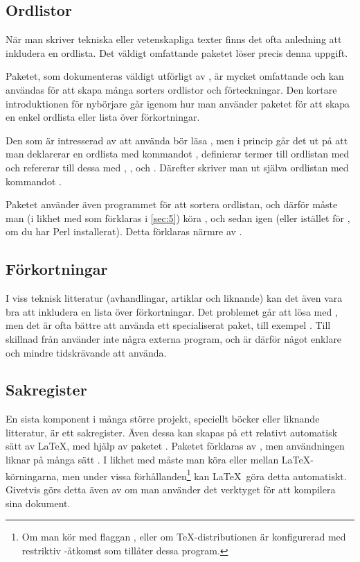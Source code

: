 \documentclass[10pt,../../a4.tex]{subfiles}
\begin{document}
\subsection{Ordlistor}\label{sec:2:glossaries}
När man skriver tekniska eller vetenskapliga texter finns det ofta
anledning att inkludera en ordlista. Det väldigt omfattande paketet
 löser precis denna uppgift.

Paketet, som dokumenteras väldigt utförligt av \textcite{Talbot13a},
är mycket omfattande och kan användas för att skapa många sorters
ordlistor och förteckningar. Den kortare introduktionen för nybörjare
\parencite{Talbot13b} går igenom hur man använder paketet för att skapa
en enkel ordlista eller lista över förkortningar.

Den som är intresserad av att använda  bör läsa 
\textcite{Talbot13b}, men i princip går det ut på att man deklarerar en
ordlista med kommandot , definierar termer till
ordlistan med  och refererar till dessa med
, ,  och . Därefter skriver man
ut själva ordlistan med kommandot .

Paketet använder även programmet  för att sortera ordlistan,
och därför måste man (i likhet med  som förklaras i
\cref{sec:5}) köra ,  och sedan 
igen (eller  istället för , om du har
Perl installerat). Detta förklaras närmre av
\textcite{Talbot13a,Talbot13b}.

\subsection{Förkortningar}\label{sec:2:acro}
I viss teknisk litteratur (avhandlingar, artiklar och liknande) kan det 
även vara bra att inkludera en lista över förkortningar. Det problemet
går att lösa med , men det är ofta bättre att använda
ett specialiserat paket, till exempel 
\parencite{Niederberger13}. Till skillnad
från  använder  inte några externa program,
och är därför något enklare och mindre tidskrävande att använda.

\subsection{Sakregister}\label{sec:2:imakeidx}
En sista komponent i många större projekt, speciellt böcker eller
liknande litteratur, är ett sakregister. Även dessa kan skapas på ett
relativt automatisk sätt av \LaTeX, med hjälp av paketet .
Paketet förklaras av \textcite{Beccari12}, men användningen liknar
på många sätt . I likhet med  måste man
köra  eller  mellan \LaTeX-körningarna, men 
under vissa förhållanden\footnote{Om man kör  med flaggan
, eller om \TeX-distributionen är konfigurerad med
restriktiv -åtkomst som tillåter dessa program.} kan \LaTeX\ 
göra detta automatiskt. Givetvis görs detta även av  om man
använder det verktyget för att kompilera sina dokument.
\end{document}
